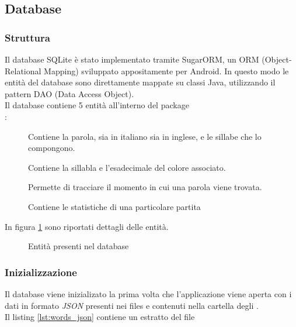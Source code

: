 


\subsection{Database}

\subsubsection{Struttura}
\label{structure}
Il database SQLite è stato implementato tramite SugarORM, un ORM (Object-Relational Mapping) sviluppato appositamente per Android. In questo modo le entità del database sono direttamente mappate su classi Java, utilizzando il pattern DAO (Data Access Object).\\
Il database contiene 5 entità all'interno del package \\:
\begin{description}
	\item[] Contiene la parola, sia in italiano sia in inglese, e le sillabe che lo compongono.
	\item[] Contiene la sillabla e l'esadecimale del colore associato.
	\item[] Permette di tracciare il momento in cui una parola viene trovata.
	\item[] Contiene le statistiche di una particolare partita
\end{description}
In figura \ref{fig:entities} sono riportati dettagli delle entità.

\begin{figure}[h!]
\label{fig:entities}
  \centering
  \caption{Entità presenti nel database}
\end{figure}

\subsubsection{Inizializzazione}
Il database viene inizializato la prima volta che l'applicazione viene aperta con i dati in formato \textit{JSON} presenti nei files  e  contenuti nella cartella degli .\\
Il listing \ref{lst:words_json} contiene un estratto del file 

